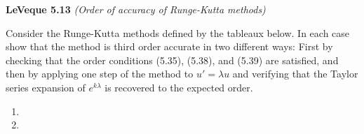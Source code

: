 \textbf{LeVeque 5.13} \textit{(Order of accuracy of Runge-Kutta methods)}

Consider the Runge-Kutta methods defined by the tableaux below.  In each case show that the method is third order 
accurate in two different ways: First by checking that the order conditions (5.35), (5.38), and (5.39) are satisfied, 
and then by applying one step of the method to $u' = \lambda u$ and verifying that the Taylor series expansion of 
$e^{k\lambda}$ is recovered to the expected order.

\begin{enumerate}
  \item 
  \pagebreak
  \item 
\end{enumerate} 